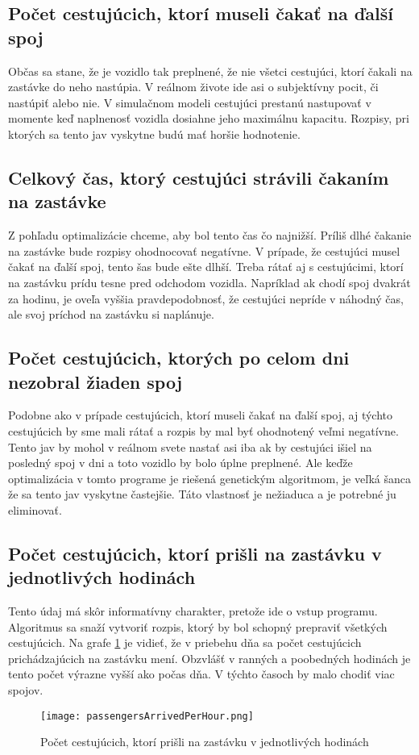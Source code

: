 \subsection*{Počet cestujúcich, ktorí museli čakať na ďalší spoj}
Občas sa stane, že je vozidlo tak preplnené, že nie všetci cestujúci, ktorí čakali na zastávke do neho nastúpia.
V reálnom živote ide asi o subjektívny pocit, či nastúpiť alebo nie.
V simulačnom modeli cestujúci prestanú nastupovať v momente keď naplnenosť vozidla dosiahne jeho maximálnu kapacitu.
Rozpisy, pri ktorých sa tento jav vyskytne budú mať horšie hodnotenie.

\subsection*{Celkový čas, ktorý cestujúci strávili čakaním na zastávke}
Z pohľadu optimalizácie chceme, aby bol tento čas čo najnižší.
Príliš dlhé čakanie na zastávke bude rozpisy ohodnocovať negatívne.
V prípade, že cestujúci musel čakať na ďalší spoj, tento šas bude ešte dlhší.
Treba rátať aj s cestujúcimi, ktorí na zastávku prídu tesne pred odchodom vozidla.
Napríklad ak chodí spoj dvakrát za hodinu, je oveľa vyššia pravdepodobnosť, že cestujúci nepríde v náhodný čas, ale svoj príchod na zastávku si naplánuje.

\subsection*{Počet cestujúcich, ktorých po celom dni nezobral žiaden spoj}
Podobne ako v prípade cestujúcich, ktorí museli čakať na ďalší spoj, aj týchto cestujúcich by sme mali rátať a rozpis by mal byť ohodnotený veľmi negatívne.
Tento jav by mohol v reálnom svete nastať asi iba ak by cestujúci išiel na posledný spoj v dni a toto vozidlo by bolo úplne preplnené.
Ale keďže optimalizácia v tomto programe je riešená genetickým algoritmom, je veľká šanca že sa tento jav vyskytne častejšie.
Táto vlastnosť je nežiaduca a je potrebné ju eliminovať.

\subsection*{Počet cestujúcich, ktorí prišli na zastávku v jednotlivých hodinách}
Tento údaj má skôr informatívny charakter, pretože ide o vstup programu.
Algoritmus sa snaží vytvoriť rozpis, ktorý by bol schopný prepraviť všetkých cestujúcich.
Na grafe \ref{fig:passengersArrivedPerHour} je vidieť, že v priebehu dňa sa počet cestujúcich prichádzajúcich na zastávku mení.
Obzvlášť v ranných a poobedných hodinách je tento počet výrazne vyšší ako počas dňa.
V týchto časoch by malo chodiť viac spojov.
\begin{figure}[h]
  \label{fig:passengersArrivedPerHour}
  \centering
  \texttt{[image: passengersArrivedPerHour.png]}
  \caption{Počet cestujúcich, ktorí prišli na zastávku v jednotlivých hodinách}
\end{figure}

